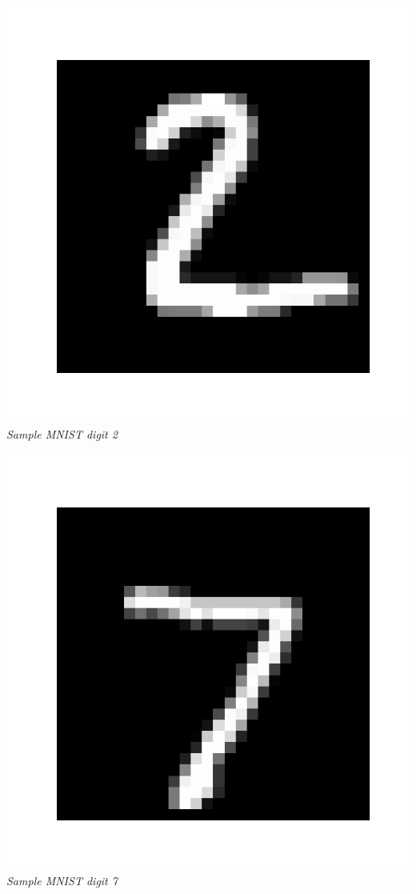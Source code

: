 \documentclass[9pt]{extarticle}
\begin{document}
\begin{minipage}{0.3\textwidth}
    \centering
    \includegraphics[scale = 0.15]{images/2_MNIST.png}
    \\ \textit{Sample MNIST digit 2}
\end{minipage}
\begin{minipage}{0.3\textwidth}
    \centering
    \includegraphics[scale = 0.15]{images/7_MNIST.png}
    \\ \textit{Sample MNIST digit 7}
\end{minipage}
\end{document}
